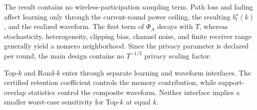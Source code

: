 \documentclass[journal]{IEEEtran}
\newenvironment{revisionblock}{\begingroup\color{revisionred}}{\endgroup}
\begin{document}
\begin{revisionblock}
The result contains no wireless-participation sampling term. Path loss and fading affect learning only through the current-round power ceiling, the resulting $b_t^\star(k)$, and the realized waveform. The first term of $\Phi_A$ decays with $T$, whereas stochasticity, heterogeneity, clipping bias, channel noise, and finite receiver range generally yield a nonzero neighborhood. Since the privacy parameter is declared per round, the main design contains no $T^{-1/2}$ privacy scaling factor.

Top-$k$ and Rand-$k$ enter through separate learning and waveform interfaces. The certified retention coefficient controls the memory contribution, while support-overlap statistics control the composite waveform. Neither interface implies a smaller worst-case sensitivity for Top-$k$ at equal $k$.

\end{revisionblock}
\end{document}
